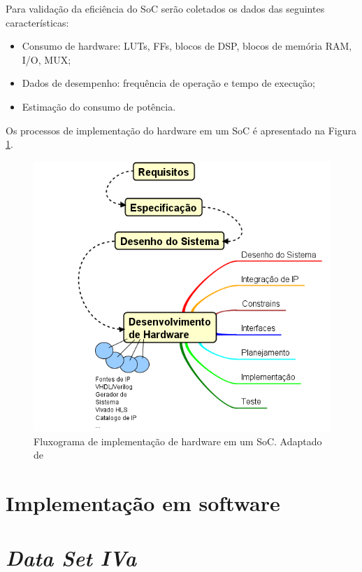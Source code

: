 Para validação da eficiência do SoC serão coletados os dados das seguintes características:
\begin{itemize}
	\item Consumo de hardware: LUTs, FFs, blocos de DSP, blocos de memória RAM, I/O, MUX;
	\item Dados de desempenho: frequência de operação e tempo de execução;
	\item Estimação do consumo de potência.
\end{itemize}

Os processos de implementação do hardware em um SoC é apresentado na Figura \ref{diagram_hardware}.

\begin{figure}[h]
	\centering
	\includegraphics[keepaspectratio=true,scale=1.0]{figuras/fluxograma_hardware.PNG}
	\caption{Fluxograma de implementação de hardware em um SoC. Adaptado de \cite{zynqBook}}
	\label{diagram_hardware}
\end{figure}

\section{Implementação em software}

\section{\textit{Data Set IVa}}

